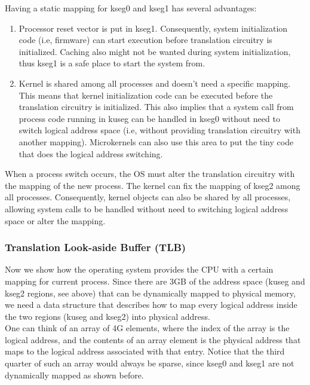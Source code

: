 \documentclass[]{scrartcl}
\begin{document}
Having a static mapping for kseg0 and kseg1 has several advantages:

\begin{enumerate}

\item Processor reset vector is put in kseg1. Consequently, system 
      initialization code (i.e, firmware) can start execution
      before translation circuitry is initialized. Caching also
      might not be wanted during system initialization, thus
      kseg1 is a safe place to start the system from.

\item Kernel is shared among all processes and doesn't need a specific
      mapping. This means that kernel initialization code can be
      executed before the translation circuitry is initialized. This
      also implies that a system call from process code running in
      kuseg can be handled in kseg0 without need to switch logical address
      space (i.e, without providing translation circuitry with another
      mapping). Microkernels can also use this area to put the tiny
      code that does the logical address switching.

\end{enumerate}

When a process switch occurs, the OS must alter the translation
circuitry with the mapping of the new process. The kernel
can fix the mapping of kseg2 among all processes. Consequently, kernel
objects can also be shared by all processes, allowing system calls
to be handled without need to switching logical address space
or alter the mapping.

\subsubsection{Translation Look-aside Buffer (TLB)}

Now we show how the operating system provides the CPU with a certain
mapping for current process. Since there are 3GB of the address
space (kuseg and kseg2 regions, see above) that can be dynamically
mapped to physical memory, we need a data structure that describes
how to map every logical address inside the two regions (kuseg and
kseg2) into physical address. \\

One can think of an array of 4G elements, where the index of the array 
is the logical address, and the contents of an array element is
the physical address that maps to the logical address associated
with that entry. Notice that the third quarter of such an
array would always be sparse, since kseg0 and kseg1 are not dynamically
mapped as shown before. \\
\end{document}
